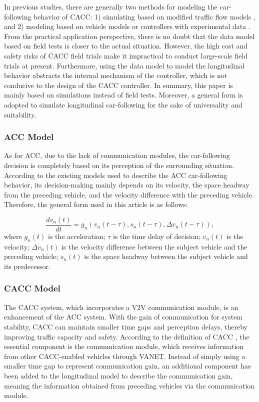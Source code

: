 \documentclass[journal]{IEEEtran}
\begin{document}
In previous studies, there are generally two methods for modeling the car-following behavior of CACC: 1) simulating based on modified traffic flow models \citep{farah2014cooperative,yu2015effects,li2015stability}, and 2) modeling based on vehicle models or controllers with experimental data \citep{fernandes2014multiplatooning,milanes2014modeling,milanes2013cooperative}. From the practical application perspective, there is no doubt that the data model based on field tests is closer to the actual situation. However, the high cost and safety risks of CACC field trials make it impractical to conduct large-scale field trials at present. Furthermore, using the data model to model the longitudinal behavior abstracts the internal mechanism of the controller, which is not conducive to the design of the CACC controller. In summary, this paper is mainly based on simulations instead of field tests. Moreover, a general form is adopted to simulate longitudinal car-following for the sake of universality and suitability.

\subsubsection{ACC Model}
As for ACC, due to the lack of communication modules, the car-following decision is completely based on its perception of the surrounding situation. According to the existing models used to describe the ACC car-following behavior, its decision-making mainly depends on its velocity, the space headway from the preceding vehicle, and the velocity difference with the preceding vehicle. Therefore, the general form used in this article is as follows:

\begin{equation}
\frac{d v_{n}(t)}{d t}=g_{n}\left(v_{n}(t-\tau), s_{n}(t-\tau), \Delta v_{n}(t-\tau)\right),
\label{Eq1}
\end{equation}
where $g_n (t)$ is the acceleration; $\tau$ is the time delay of decision; $v_n (t)$ is the velocity; $\Delta v_n (t)$ is the velocity difference between the subject vehicle and the preceding vehicle; $s_n (t)$ is the space headway between the subject vehicle and its predecessor.

\subsubsection{CACC Model}

The CACC system, which incorporates a V2V communication module, is an enhancement of the ACC system. With the gain of communication for system stability, CACC can maintain smaller time gaps and perception delays, thereby improving traffic capacity and safety. According to the definition of CACC \citep{dey2015review}, the essential component is the communication module, which receives information from other CACC-enabled vehicles through VANET. Instead of simply using a smaller time gap to represent communication gain, an additional component has been added to the longitudinal model to describe the communication gain, meaning the information obtained from preceding vehicles via the communication module.
\end{document}
